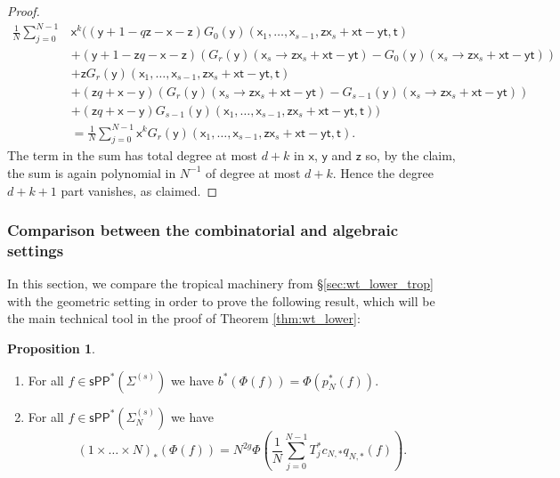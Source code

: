 \documentclass[11pt]{article}
\newcommand{\sPP}{\mathsf{sPP}}
\newcommand{\spp}{\sPP}
\theoremstyle{definition}
\newtheorem{proposition}[definition]{Proposition}
\begin{document}
\begin{proof}
{\begin{align*}
		\frac{1}{N}\sum_{j=0}^{N-1}&\mathsf{x}^{k}\biggl((\mathsf{y}+1-q\mathsf{z}-\mathsf{x}-\mathsf{z})G_0\left(\mathsf{y}\right)\left(\mathsf{x}_1,\dots,\mathsf{x}_{s-1},\mathsf{z}\mathsf{x}_s+\mathsf{x}\mathsf{t}-\mathsf{y} \mathsf{t},\mathsf{t}\right)\\
				&+\left(\mathsf{y}+1-\mathsf{z}q-\mathsf{x}-\mathsf{z}\right)(G_{r}(\mathsf{y})(\mathsf{x}_s\to \mathsf{z}\mathsf{x}_s+\mathsf{x}\mathsf{t}-\mathsf{y}\mathsf{t})-G_0(\mathsf{y})(\mathsf{x}_s\to \mathsf{z}\mathsf{x}_s+\mathsf{x}\mathsf{t}-\mathsf{y}\mathsf{t}))\\
				&+\mathsf{z}G_r\left(\mathsf{y}\right)\left(\mathsf{x}_1,\dots,\mathsf{x}_{s-1},\mathsf{z}\mathsf{x}_s+\mathsf{x}\mathsf{t}-\mathsf{y} \mathsf{t},\mathsf{t}\right)\\
				&+\left(\mathsf{z}q+\mathsf{x}-\mathsf{y}\right)(G_r(\mathsf{y})(\mathsf{x}_s\to \mathsf{z}\mathsf{x}_s+\mathsf{x}\mathsf{t}-\mathsf{y}\mathsf{t})-G_{s-1}(\mathsf{y})(\mathsf{x}_s\to \mathsf{z}\mathsf{x}_s+\mathsf{x}\mathsf{t}-\mathsf{y}\mathsf{t}))\\
				&+(\mathsf{z}q+\mathsf{x}-\mathsf{y})G_{s-1}\left(\mathsf{y}\right)\left(\mathsf{x}_1,\dots,\mathsf{x}_{s-1},\mathsf{z}\mathsf{x}_s+\mathsf{x}\mathsf{t}-\mathsf{y} \mathsf{t},\mathsf{t}\right)\biggr)\\
				&=\frac{1}{N}\sum_{j=0}^{N-1}\mathsf{x}^{k}G_r\left(\mathsf{y}\right)\left(\mathsf{x}_1,\dots,\mathsf{x}_{s-1},\mathsf{z}\mathsf{x}_s+\mathsf{x}\mathsf{t}-\mathsf{y} \mathsf{t},\mathsf{t}\right).
		\end{align*}}
		The term in the sum has total degree at most $d+k$ in $\mathsf{x}$, $\mathsf{y}$ and $\mathsf{z}$ so, by the
		claim, the sum is again polynomial in $N^{-1}$
		of degree at most $d+k$. Hence the degree $d+k+1$ part vanishes, as claimed.
\end{proof}

\subsubsection{Comparison between the combinatorial and algebraic settings}

\label{sec:wt_lower_pushforwards}

In this section, we compare the tropical machinery from
\S\ref{sec:wt_lower_trop} with the geometric setting in
order to prove the following result, which will be the main technical
tool in the proof of Theorem \ref{thm:wt_lower}:

\begin{proposition}\label{prop:push_pull_trop_geom_lower}
\begin{enumerate}[label = (\alph*)]
	\item For all $f\in \spp^{\ast}(\Sigma^{(s)})$ we have $b^{\ast}(\Phi(f))=\Phi(p_N^{\ast}(f))$.
	\item For all $f\in \spp^{\ast}(\Sigma_N^{(s)})$ we have
		$$(1\times\dots\times N)_{\ast}(\Phi(f))=N^{2g}\Phi\left(\frac{1}{N}\sum_{j=0}^{N-1}T_j ^{\ast}c_{N,\ast}q_{N,\ast}(f)\right).$$
\end{enumerate}
\end{proposition}
\end{document}
